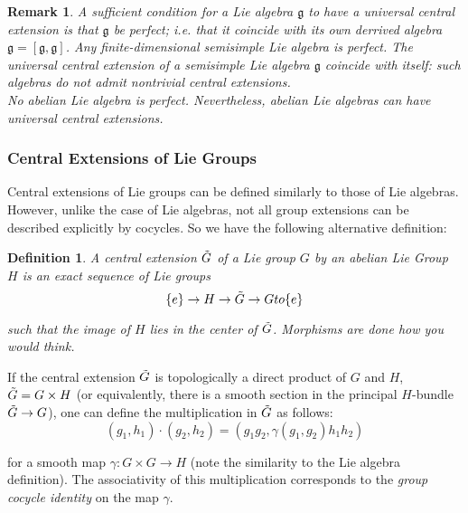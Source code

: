 \documentclass{article}
\newtheorem{defn}{Definition}
\newtheorem{rmk}{Remark}
\begin{document}
\begin{rmk}

	A sufficient condition for a Lie algebra $ \mathfrak{g}$ to have a universal central extension is that $ \mathfrak{g}$ be perfect; i.e. that it coincide with its own derrived algebra $ \mathfrak{g} = [ \mathfrak{g}, \mathfrak{g}]$. Any finite-dimensional semisimple Lie algebra is perfect. The universal central extension of a semisimple Lie algebra $ \mathfrak{g}$ coincide with itself: such algebras do not admit nontrivial central extensions. \\
	\indent No abelian Lie algebra is perfect. Nevertheless, abelian Lie algebras can have universal central extensions.

\end{rmk}

\subsubsection{Central Extensions of Lie Groups}

Central extensions of Lie groups can be defined similarly to those of Lie algebras. However, unlike the case of Lie algebras, not all group extensions can be described explicitly by cocycles. So we have the following alternative definition:



\begin{defn}

	A \textit{central extension} $ \Tilde{G}$ of a Lie group $G$ by an abelian Lie Group $H$ is an exact sequence of Lie groups
	\[
		\{ e \} \to H \to \Tilde{G} \to G to \{ e \} 
	\]

such that the image of $H$ lies in the center of $\Tilde{G}$. Morphisms are done how you would think.
\end{defn}

\indent If the central extension $ \Tilde{ G }$ is topologically a direct product of $G$ and $H$, $ \Tilde{ G }= G \times H$ (or equivalently, there is a smooth section in the principal $H$-bundle $ \Tilde{ G } \to G$), one can define the multiplication in $ \Tilde{ G }$ as follows:
\[
	(g_1, h_1) \cdot (g_2, h_2) = (g_1 g_2, \gamma (g_1, g_2) h_1 h_2)
\]

for a smooth map $ \gamma: G \times G \to H$ (note the similarity to the Lie algebra definition). The associativity of this multiplication corresponds to the \textit{group cocycle identity} on the map $ \gamma$.
\end{document}
